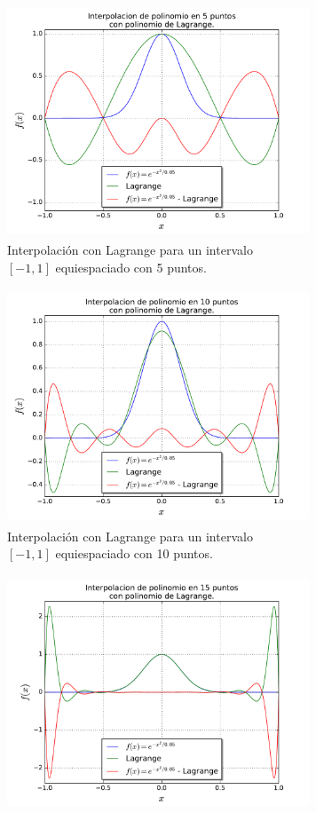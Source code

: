 \documentclass[a4paper, 11pt, spanish]{article}
\begin{document}
\begin{figure}[!hbpt]
\centering
\begin{subfigure}{.5\textwidth}
  \centering
  \includegraphics[width=9cm, height=7cm]{img/lagrange5.pdf}
  \caption{Interpolaci\'on con Lagrange para un intervalo\\ $[-1,1]$ equiespaciado con 5 puntos.}
\end{subfigure}%
\begin{subfigure}{.5\textwidth}
  \centering
  \includegraphics[width=9cm, height=7cm]{img/lagrange10.pdf}
  \caption{Interpolaci\'on con Lagrange para un intervalo\\ $[-1,1]$ equiespaciado con 10 puntos.}
\end{subfigure}
\begin{subfigure}{.5\textwidth}
  \centering
  \includegraphics[width=9cm, height=7cm]{img/lagrange15.pdf}

\end{subfigure}
\end{figure}
\end{document}
